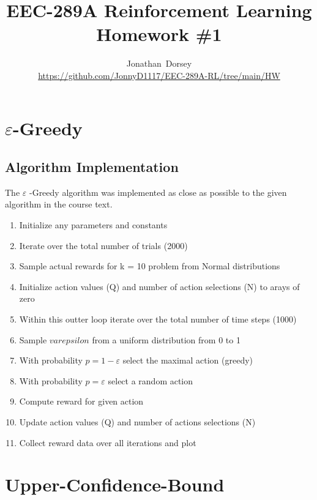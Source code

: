\documentclass[12pt]{article}
\begin{document}
\title{ EEC-289A Reinforcement Learning \\ Homework \#1 }


\author{Jonathan~Dorsey \\\url{https://github.com/JonnyD1117/EEC-289A-RL/tree/main/HW}}
\maketitle




\section*{ $\varepsilon$-Greedy}

\subsection*{Algorithm Implementation} The $ \varepsilon$ -Greedy algorithm was implemented as close as possible to the given algorithm in the course text.

\begin{enumerate}
    \item Initialize any parameters and constants
    \item Iterate over the total number of trials (2000)
    \item Sample actual rewards for k = 10 problem from Normal distributions
    \item Initialize action values (Q) and number of action selections (N) to arays of zero
    \item Within this outter loop iterate over the total number of time steps (1000)
    \item Sample $varepsilon$ from a uniform distribution from 0 to 1
    \item With probability $p = 1 - \varepsilon$  select the maximal action (greedy)
    \item With probability $p = \varepsilon$ select a random action
    \item Compute reward for given action
    \item Update action values (Q) and number of actions selections (N)
    \item Collect reward data over all iterations and plot

\end{enumerate}


\section*{Upper-Confidence-Bound}
\end{document}
